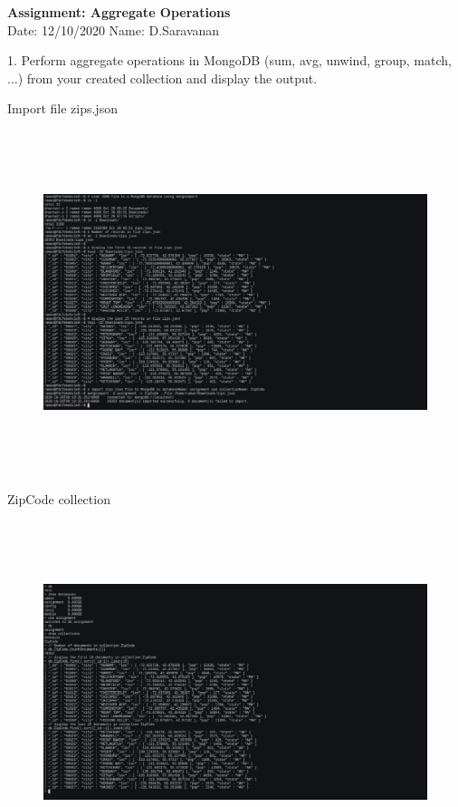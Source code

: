 \documentclass[a4paper,11pt,openright]{report}
\begin{document}
\singlespacing
\pagestyle{plain}

\begin{small}
\begin{center}
\textbf{Assignment: Aggregate Operations} \\
Date: 12/10/2020 \hspace{2mm} Name: D.Saravanan
\end{center}
\end{small}

\vspace{10px}

\begin{footnotesize}
1. Perform aggregate operations in MongoDB (sum, avg, unwind, group, match, ...) from your
created collection and display the output.
\end{footnotesize}

{\footnotesize Import file zips.json}
\begin{figure}[ht!]
\includegraphics[width=20cm,height=10cm,keepaspectratio]{image1.pdf}
\centering
\end{figure}

{\footnotesize ZipCode collection}
\begin{figure}[ht!]
\includegraphics[width=20cm,height=10cm,keepaspectratio]{image2.pdf}
\centering
\end{figure}
\end{document}
